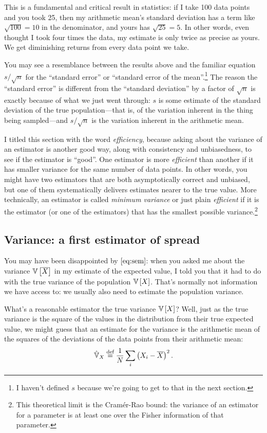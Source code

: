 This is a fundamental and critical result in statistics: if I take 100 data
points and you took 25, then my arithmetic mean's standard deviation has a
term like $\sqrt{100} = 10$ in the denominator, and yours has $\sqrt{25} = 5$.
In other words, even thought I took four times the data, my estimate is only
twice as precise as yours. We get diminishing returns from every data point
we take.

You may see a resemblance between the results above and the familiar equation
$s/\sqrt{n}$ for the ``standard error'' or ``standard error of the
mean''.\footnote{I haven't defined $s$ because we're going to get to that in
the next section.} The reason the ``standard error'' is different from the
``standard deviation'' by a factor of $\sqrt{n}$ is exactly because of what we
just went through: $s$ is some estimate of the standard deviation of the true
population---that is, of the variation inherent in the thing being
sampled---and $s/\sqrt{n}$ is the variation inherent in the arithmetic mean.

I titled this section with the word \emph{efficiency}, because asking about
the variance of an estimator is another good way, along with consistency and
unbiasedness, to see if the estimator is ``good''. One estimator is more
\emph{efficient} than another if it has smaller variance for the same number
of data points. In other words, you might have two estimators that are both
asymptotically correct and unbiased, but one of them systematically delivers
estimates nearer to the true value. More technically, an estimator is called
\emph{minimum variance} or just plain \emph{efficient} if it is the estimator
(or one of the estimators) that has the smallest possible
variance.\footnote{This theoretical limit is the Cram\'{e}r-Rao bound: the
variance of an estimator for a parameter is at least one over the Fisher
information of that parameter.}

\subsection{Variance: a first estimator of spread}

You may have been disappointed by $\eqref{eq:sem}$: when you asked me about
the variance $\mathbb{V}\left[{\overline{X}}\right]$ in my estimate of the expected value, I told you that it had to
do with the true variance of the population $\mathbb{V}\left[{X}\right]$. That's normally not
information we have access to: we usually also need to estimate the population
variance.

What's a reasonable estimator the true variance $\mathbb{V}\left[{X}\right]$? Well, just as the
true variance is the square of the values in the distribution from their true
expected value, we might guess that an estimate for the variance is the
arithmetic mean of the squares of the deviations of the data points from their
arithmetic mean:
\begin{equation}\label{eq:estimator-vx1}
\hat{\mathbb{V}}_X \stackrel{\text{def}}{=} \frac{1}{N} \sum_i \left( X_i - \overline{X} \right)^2.
\end{equation}

